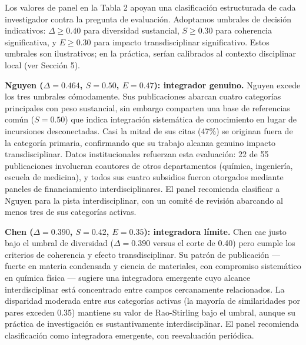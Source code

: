 \documentclass[
]{article}
\begin{document}
Los valores de panel en la Tabla 2 apoyan una clasificación estructurada
de cada investigador contra la pregunta de evaluación. Adoptamos
umbrales de decisión indicativos: \(\Delta \geq 0.40\) para diversidad
sustancial, \(S \geq 0.30\) para coherencia significativa, y
\(E \geq 0.30\) para impacto transdisciplinar significativo. Estos
umbrales son ilustrativos; en la práctica, serían calibrados al contexto
disciplinar local (ver Sección 5).

\textbf{Nguyen (\(\Delta = 0.464\), \(S = 0.50\), \(E = 0.47\)):
integrador genuino.} Nguyen excede los tres umbrales cómodamente. Sus
publicaciones abarcan cuatro categorías principales con peso sustancial,
sin embargo comparten una base de referencias común (\(S = 0.50\)) que
indica integración sistemática de conocimiento en lugar de incursiones
desconectadas. Casi la mitad de sus citas (47\%) se originan fuera de la
categoría primaria, confirmando que su trabajo alcanza genuino impacto
transdisciplinar. Datos institucionales refuerzan esta evaluación: 22 de
55 publicaciones involucran coautores de otros departamentos (química,
ingeniería, escuela de medicina), y todos sus cuatro subsidios fueron
otorgados mediante paneles de financiamiento interdisciplinares. El
panel recomienda clasificar a Nguyen para la pista interdisciplinar, con
un comité de revisión abarcando al menos tres de sus categorías activas.

\textbf{Chen (\(\Delta = 0.390\), \(S = 0.42\), \(E = 0.35\)):
integradora límite.} Chen cae justo bajo el umbral de diversidad
(\(\Delta = 0.390\) versus el corte de 0.40) pero cumple los criterios
de coherencia y efecto transdisciplinar. Su patrón de publicación ---
fuerte en materia condensada y ciencia de materiales, con compromiso
sistemático en química física --- sugiere una integradora emergente cuyo
alcance interdisciplinar está concentrado entre campos cercanamente
relacionados. La disparidad moderada entre sus categorías activas (la
mayoría de similaridades por pares exceden 0.35) mantiene su valor de
Rao-Stirling bajo el umbral, aunque su práctica de investigación es
sustantivamente interdisciplinar. El panel recomienda clasificación como
integradora emergente, con reevaluación periódica.
\end{document}
